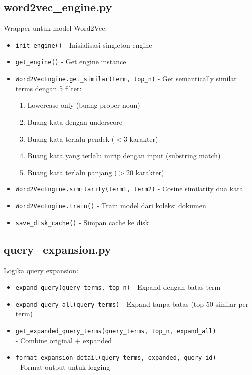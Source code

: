 \documentclass[12pt,a4paper]{report}
\begin{document}
\subsection{word2vec\_engine.py}
Wrapper untuk model Word2Vec:
\begin{itemize}
    \item \texttt{init\_engine()} - Inisialisasi singleton engine
    \item \texttt{get\_engine()} - Get engine instance
    \item \texttt{Word2VecEngine.get\_similar(term, top\_n)} - Get semantically similar terms dengan 5 filter:
    \begin{enumerate}
        \item Lowercase only (buang proper noun)
        \item Buang kata dengan underscore
        \item Buang kata terlalu pendek ($< 3$ karakter)
        \item Buang kata yang terlalu mirip dengan input (substring match)
        \item Buang kata terlalu panjang ($> 20$ karakter)
    \end{enumerate}
    \item \texttt{Word2VecEngine.similarity(term1, term2)} - Cosine similarity dua kata
    \item \texttt{Word2VecEngine.train()} - Train model dari koleksi dokumen
    \item \texttt{save\_disk\_cache()} - Simpan cache ke disk
\end{itemize}

\subsection{query\_expansion.py}
Logika query expansion:
\begin{itemize}
    \item \texttt{expand\_query(query\_terms, top\_n)} - Expand dengan batas term
    \item \texttt{expand\_query\_all(query\_terms)} - Expand tanpa batas (top-50 similar per term)
    \item \texttt{get\_expanded\_query\_terms(query\_terms, top\_n, expand\_all)}\\ - Combine original + expanded
    \item \texttt{format\_expansion\_detail(query\_terms, expanded, query\_id)}\\ - Format output untuk logging
\end{itemize}
\end{document}
